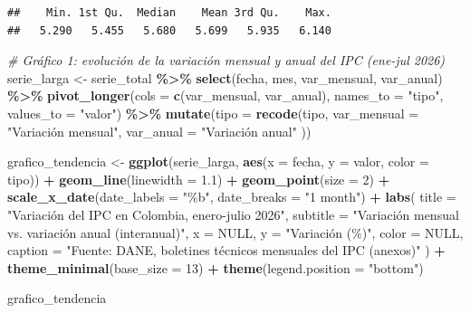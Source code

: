 \documentclass[
]{article}
\newenvironment{Shaded}{\begin{snugshade}}{\end{snugshade}}
\newcommand{\AttributeTok}[1]{\textcolor[rgb]{0.13,0.29,0.53}{#1}}
\newcommand{\CommentTok}[1]{\textcolor[rgb]{0.56,0.35,0.01}{\textit{#1}}}
\newcommand{\ConstantTok}[1]{\textcolor[rgb]{0.56,0.35,0.01}{#1}}
\newcommand{\DecValTok}[1]{\textcolor[rgb]{0.00,0.00,0.81}{#1}}
\newcommand{\FloatTok}[1]{\textcolor[rgb]{0.00,0.00,0.81}{#1}}
\newcommand{\FunctionTok}[1]{\textcolor[rgb]{0.13,0.29,0.53}{\textbf{#1}}}
\newcommand{\NormalTok}[1]{#1}
\newcommand{\OtherTok}[1]{\textcolor[rgb]{0.56,0.35,0.01}{#1}}
\newcommand{\SpecialCharTok}[1]{\textcolor[rgb]{0.81,0.36,0.00}{\textbf{#1}}}
\newcommand{\StringTok}[1]{\textcolor[rgb]{0.31,0.60,0.02}{#1}}
\begin{document}
\begin{Shaded}
\end{Shaded}

\begin{verbatim}
##    Min. 1st Qu.  Median    Mean 3rd Qu.    Max. 
##   5.290   5.455   5.680   5.699   5.935   6.140
\end{verbatim}

\begin{Shaded}
\begin{Highlighting}[]
\CommentTok{\# Gráfico 1: evolución de la variación mensual y anual del IPC (ene{-}jul 2026)}
\NormalTok{serie\_larga }\OtherTok{\textless{}{-}}\NormalTok{ serie\_total }\SpecialCharTok{\%\textgreater{}\%}
  \FunctionTok{select}\NormalTok{(fecha, mes, var\_mensual, var\_anual) }\SpecialCharTok{\%\textgreater{}\%}
  \FunctionTok{pivot\_longer}\NormalTok{(}\AttributeTok{cols =} \FunctionTok{c}\NormalTok{(var\_mensual, var\_anual), }\AttributeTok{names\_to =} \StringTok{"tipo"}\NormalTok{, }\AttributeTok{values\_to =} \StringTok{"valor"}\NormalTok{) }\SpecialCharTok{\%\textgreater{}\%}
  \FunctionTok{mutate}\NormalTok{(}\AttributeTok{tipo =} \FunctionTok{recode}\NormalTok{(tipo,}
    \AttributeTok{var\_mensual =} \StringTok{"Variación mensual"}\NormalTok{,}
    \AttributeTok{var\_anual   =} \StringTok{"Variación anual"}
\NormalTok{  ))}

\NormalTok{grafico\_tendencia }\OtherTok{\textless{}{-}} \FunctionTok{ggplot}\NormalTok{(serie\_larga, }\FunctionTok{aes}\NormalTok{(}\AttributeTok{x =}\NormalTok{ fecha, }\AttributeTok{y =}\NormalTok{ valor, }\AttributeTok{color =}\NormalTok{ tipo)) }\SpecialCharTok{+}
  \FunctionTok{geom\_line}\NormalTok{(}\AttributeTok{linewidth =} \FloatTok{1.1}\NormalTok{) }\SpecialCharTok{+}
  \FunctionTok{geom\_point}\NormalTok{(}\AttributeTok{size =} \DecValTok{2}\NormalTok{) }\SpecialCharTok{+}
  \FunctionTok{scale\_x\_date}\NormalTok{(}\AttributeTok{date\_labels =} \StringTok{"\%b"}\NormalTok{, }\AttributeTok{date\_breaks =} \StringTok{"1 month"}\NormalTok{) }\SpecialCharTok{+}
  \FunctionTok{labs}\NormalTok{(}
    \AttributeTok{title =} \StringTok{"Variación del IPC en Colombia, enero{-}julio 2026"}\NormalTok{,}
    \AttributeTok{subtitle =} \StringTok{"Variación mensual vs. variación anual (interanual)"}\NormalTok{,}
    \AttributeTok{x =} \ConstantTok{NULL}\NormalTok{, }\AttributeTok{y =} \StringTok{"Variación (\%)"}\NormalTok{, }\AttributeTok{color =} \ConstantTok{NULL}\NormalTok{,}
    \AttributeTok{caption =} \StringTok{"Fuente: DANE, boletines técnicos mensuales del IPC (anexos)"}
\NormalTok{  ) }\SpecialCharTok{+}
  \FunctionTok{theme\_minimal}\NormalTok{(}\AttributeTok{base\_size =} \DecValTok{13}\NormalTok{) }\SpecialCharTok{+}
  \FunctionTok{theme}\NormalTok{(}\AttributeTok{legend.position =} \StringTok{"bottom"}\NormalTok{)}

\NormalTok{grafico\_tendencia}
\end{Highlighting}
\end{Shaded}
\end{document}
